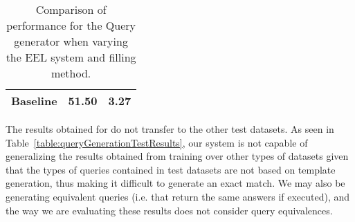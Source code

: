 \begin{table}[h!]
\begin{tabular}{|c|cc|cc|}
    \multicolumn{3}{|c|}{Baseline}                                                                                                                                                                                                           & 51.50                                     & 3.27                   \\ \hline
    \end{tabular}%
    \caption{Comparison of performance for the \SPARQL{} Query generator when varying the EEL system and filling method.}
    \label{table:queryGenerationResults}
\end{table}

The results obtained for \LCQuADtwo{} do not transfer to the other test datasets. As seen in 
Table~\ref{table:queryGenerationTestResults}, our system is not capable of generalizing the results 
obtained from training over other types of datasets given that the types of queries contained in 
test datasets are not based on template generation, thus making it difficult to generate an exact 
match. We may also be generating equivalent \SPARQL{} queries (i.e. that return the same answers if 
executed), and the way we are evaluating these results does not consider \SPARQL{} query equivalences.

